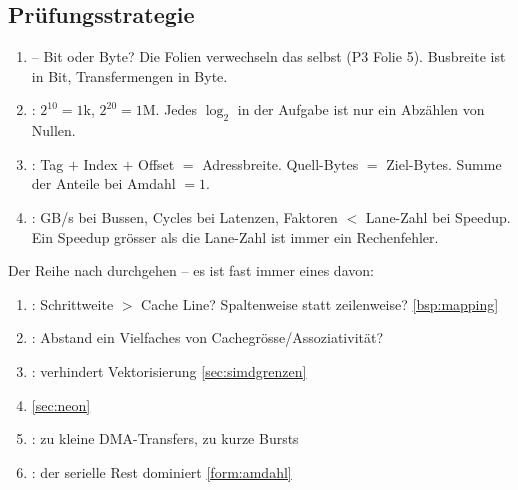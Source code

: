 \subsection{Prüfungsstrategie}
\begin{rezept}
\begin{enumerate}
\item {} -- Bit oder Byte? Die Folien verwechseln das
      selbst (P3 Folie 5). Busbreite ist in Bit, Transfermengen in Byte.
\item {}: $2^{10}=1$k, $2^{20}=1$M.
      Jedes $\log_2$ in der Aufgabe ist nur ein Abzählen von Nullen.
\item {}: Tag $+$ Index $+$ Offset $=$ Adressbreite.
      Quell-Bytes $=$ Ziel-Bytes. Summe der Anteile bei Amdahl $=1$.
\item {}: GB/s bei Bussen, Cycles bei Latenzen,
      Faktoren $<$ Lane-Zahl bei Speedup. Ein Speedup grösser als die
      Lane-Zahl ist immer ein Rechenfehler.
\end{enumerate}
\end{rezept}
\begin{rezept}
Der Reihe nach durchgehen -- es ist fast immer eines davon:
\begin{enumerate}
\item {}: Schrittweite $>$ Cache Line? Spaltenweise
      statt zeilenweise? \ra \ref{bsp:mapping}
\item {}: Abstand ein Vielfaches von Cachegrösse/Assoziativität?
\item {}: verhindert Vektorisierung
      \ra \ref{sec:simdgrenzen}
\item {} \ra \ref{sec:neon}
\item {}: zu kleine DMA-Transfers, zu kurze Bursts
\item {}: der serielle Rest dominiert \ra \ref{form:amdahl}
\end{enumerate}
\end{rezept}
